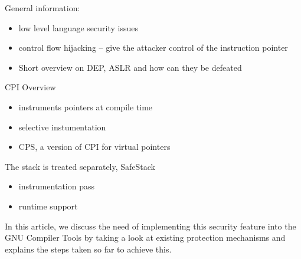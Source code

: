 
General information:
\begin {itemize}
    \item  low level language security issues 
    \item control flow hijacking -- give the attacker control of
    the instruction pointer
    \item  Short overview on DEP, ASLR and how can they be defeated
\end {itemize}
CPI Overview \cite {cpipaper}
\begin {itemize}
    \item instruments pointers at compile time
    \item selective instumentation
    \item CPS, a version of CPI for virtual pointers
\end {itemize}
The stack is treated separately, SafeStack
\begin {itemize}
    \item instrumentation pass
    \item runtime support 
\end {itemize}

In this article, we discuss the need of implementing this security
feature into the GNU Compiler Tools by taking a look at existing
protection mechanisms and explains the steps taken so far to achieve
this.


